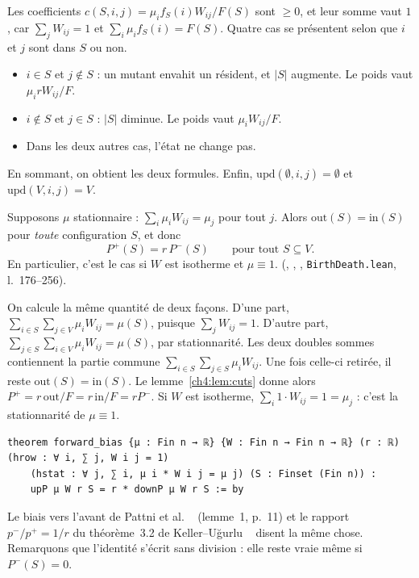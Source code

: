 \begin{humanproof}
Les coefficients $c(S,i,j)=\mu_if_S(i)W_{ij}/F(S)$ sont $\ge0$, et leur somme vaut $1$, car $\sum_jW_{ij}=1$ et
$\sum_i\mu_if_S(i)=F(S)$. Quatre cas se présentent selon que $i$ et $j$ sont dans $S$ ou non.
\begin{itemize}[itemsep=1pt]
\item $i\in S$ et $j\notin S$ : un mutant envahit un résident, et $|S|$ augmente. Le poids vaut $\mu_irW_{ij}/F$.
\item $i\notin S$ et $j\in S$ : $|S|$ diminue. Le poids vaut $\mu_iW_{ij}/F$.
\item Dans les deux autres cas, l'état ne change pas.
\end{itemize}
En sommant, on obtient les deux formules. Enfin, $\mathrm{upd}(\emptyset,i,j)=\emptyset$ et $\mathrm{upd}(V,i,j)=V$.
\end{humanproof}

\begin{proposition}\label{ch4:prop:bias}
Supposons $\mu$ stationnaire : $\sum_i\mu_iW_{ij}=\mu_j$ pour tout $j$. Alors $\mathrm{out}(S)=\mathrm{in}(S)$ pour
\emph{toute} configuration $S$, et donc
\[
P^{+}(S)=r\,P^{-}(S)\qquad\text{pour tout }S\subseteq V .
\]
En particulier, c'est le cas si $W$ est isotherme et $\mu\equiv1$. \tierA{} (,
, , \texttt{BirthDeath.lean}, l.~176--256).
\end{proposition}

\begin{humanproof}
On calcule la même quantité de deux façons. D'une part, $\sum_{i\in S}\sum_{j\in V}\mu_iW_{ij}=\mu(S)$, puisque
$\sum_jW_{ij}=1$. D'autre part, $\sum_{j\in S}\sum_{i\in V}\mu_iW_{ij}=\mu(S)$, par stationnarité. Les deux doubles
sommes contiennent la partie commune $\sum_{i\in S}\sum_{j\in S}\mu_iW_{ij}$. Une fois celle-ci retirée, il reste
$\mathrm{out}(S)=\mathrm{in}(S)$. Le lemme~\ref{ch4:lem:cuts} donne alors $P^{+}=r\,\mathrm{out}/F=r\,\mathrm{in}/F=rP^{-}$.
Si $W$ est isotherme, $\sum_i1\cdot W_{ij}=1=\mu_j$ : c'est la stationnarité de $\mu\equiv1$.
\end{humanproof}

\begin{leanbox}
\begin{lstlisting}[language=Lean]
theorem forward_bias {μ : Fin n → ℝ} {W : Fin n → Fin n → ℝ} (r : ℝ) (hrow : ∀ i, ∑ j, W i j = 1)
    (hstat : ∀ j, ∑ i, μ i * W i j = μ j) (S : Finset (Fin n)) :
    upP μ W r S = r * downP μ W r S := by
\end{lstlisting}
Le biais vers l'avant de Pattni et al. \tierL{}~\cite{ch4:PBRS} (lemme~1, p.~11) et le rapport $p^-/p^+=1/r$ du
théorème~3.2 de Keller--Uğurlu \tierL{}~\cite{ch4:KU} disent la même chose. Remarquons que l'identité s'écrit
sans division : elle reste vraie même si $P^{-}(S)=0$.
\end{leanbox}

